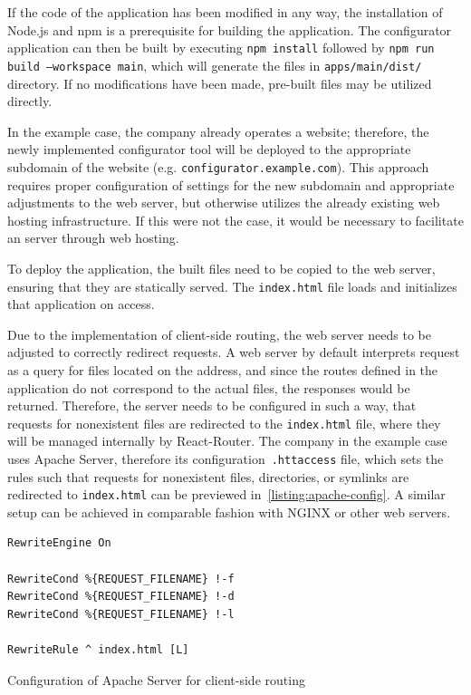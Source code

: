 If the code of the application has been modified in any way, the installation of Node.js and npm is a prerequisite for building the application. The configurator application can then be built by executing \texttt{npm install} followed by \texttt{npm run build --workspace main}, which will generate the files in \texttt{apps/main/dist/} directory. If no modifications have been made, pre-built files may be utilized directly.

In the example case, the company already operates a website; therefore, the newly implemented configurator tool will be deployed to the appropriate subdomain of the website (e.g. \texttt{configurator.example.com}). This approach requires proper configuration of  settings for the new subdomain and appropriate adjustments to the web server, but otherwise utilizes the already existing web hosting infrastructure. If this were not the case, it would be necessary to facilitate an  server through web hosting.

To deploy the application, the built files need to be copied to the web server, ensuring that they are statically served. The \texttt{index.html} file loads and initializes that application on access.

Due to the implementation of client-side routing, the web server needs to be adjusted to correctly redirect requests. A web server by default interprets request as a query for files located on the  address, and since the routes defined in the application do not correspond to the actual files, the  responses would be returned. Therefore, the server needs to be configured in such a way, that requests for nonexistent files are redirected to the \texttt{index.html} file, where they will be managed internally by React-Router. The company in the example case uses Apache  Server, therefore its configuration~\texttt{.httaccess} file, which sets the rules such that requests for nonexistent files, directories, or symlinks are redirected to \texttt{index.html} can be previewed in~\autoref{listing:apache-config}. A similar setup can be achieved in comparable fashion with NGINX or other web servers.

\begin{listing}[h]
\begin{verbatim}
RewriteEngine On
 
RewriteCond %{REQUEST_FILENAME} !-f
RewriteCond %{REQUEST_FILENAME} !-d
RewriteCond %{REQUEST_FILENAME} !-l
 
RewriteRule ^ index.html [L]
\end{verbatim}
\caption{Configuration of Apache  Server for client-side routing}
\label{listing:apache-config}
\end{listing}

